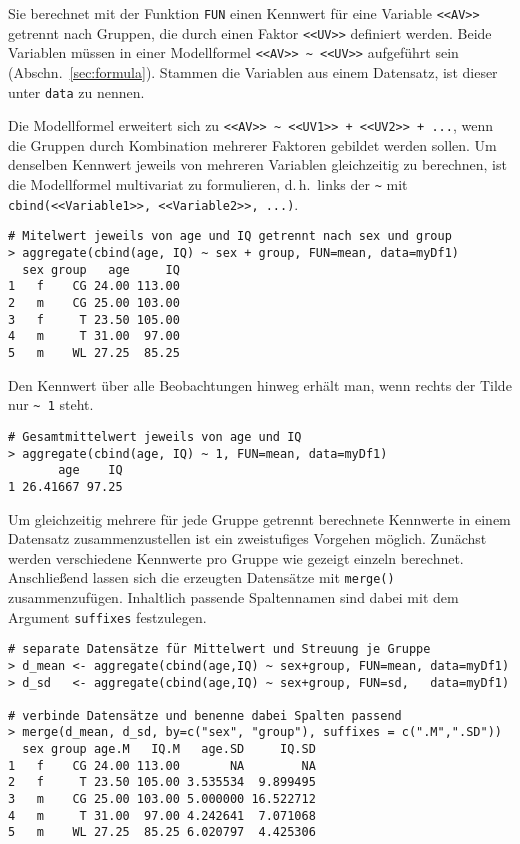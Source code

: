 Sie berechnet mit der Funktion \lstinline!FUN! einen Kennwert für eine Variable \lstinline!<<AV>>! getrennt nach Gruppen, die durch einen Faktor \lstinline!<<UV>>! definiert werden. Beide Variablen müssen in einer Modellformel \lstinline!<<AV>> ~ <<UV>>! aufgeführt sein (Abschn.\ \ref{sec:formula}). Stammen die Variablen aus einem Datensatz, ist dieser unter \lstinline!data! zu nennen.

Die Modellformel erweitert sich zu \lstinline!<<AV>> ~ <<UV1>> + <<UV2>> + ...!, wenn die Gruppen durch Kombination mehrerer Faktoren gebildet werden sollen. Um denselben Kennwert jeweils von mehreren Variablen gleichzeitig zu berechnen, ist die Modellformel multivariat zu formulieren, d.\,h.\ links der \lstinline!~! mit \lstinline!cbind(<<Variable1>>, <<Variable2>>, ...)!.
\begin{lstlisting}
# Mitelwert jeweils von age und IQ getrennt nach sex und group
> aggregate(cbind(age, IQ) ~ sex + group, FUN=mean, data=myDf1)
  sex group   age     IQ
1   f    CG 24.00 113.00
2   m    CG 25.00 103.00
3   f     T 23.50 105.00
4   m     T 31.00  97.00
5   m    WL 27.25  85.25
\end{lstlisting}

Den Kennwert über alle Beobachtungen hinweg erhält man, wenn rechts der Tilde nur \lstinline!~ 1! steht.
\begin{lstlisting}
# Gesamtmittelwert jeweils von age und IQ
> aggregate(cbind(age, IQ) ~ 1, FUN=mean, data=myDf1)
       age    IQ
1 26.41667 97.25
\end{lstlisting}

Um gleichzeitig mehrere für jede Gruppe getrennt berechnete Kennwerte in einem Datensatz zusammenzustellen ist ein zweistufiges Vorgehen möglich. Zunächst werden verschiedene Kennwerte pro Gruppe wie gezeigt einzeln berechnet. Anschließend lassen sich die erzeugten Datensätze mit \lstinline!merge()! zusammenzufügen. Inhaltlich passende Spaltennamen sind dabei mit dem Argument \lstinline!suffixes! festzulegen.
\begin{lstlisting}
# separate Datensätze für Mittelwert und Streuung je Gruppe
> d_mean <- aggregate(cbind(age,IQ) ~ sex+group, FUN=mean, data=myDf1)
> d_sd   <- aggregate(cbind(age,IQ) ~ sex+group, FUN=sd,   data=myDf1)

# verbinde Datensätze und benenne dabei Spalten passend
> merge(d_mean, d_sd, by=c("sex", "group"), suffixes = c(".M",".SD"))
  sex group age.M   IQ.M   age.SD     IQ.SD
1   f    CG 24.00 113.00       NA        NA
2   f     T 23.50 105.00 3.535534  9.899495
3   m    CG 25.00 103.00 5.000000 16.522712
4   m     T 31.00  97.00 4.242641  7.071068
5   m    WL 27.25  85.25 6.020797  4.425306
\end{lstlisting}

